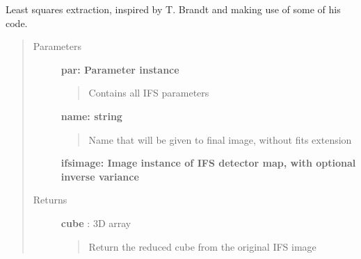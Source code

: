 \documentclass[letterpaper,10pt,english]{sphinxmanual}
\begin{document}
\begin{fulllineitems}
\label{tools:tools.reduction.lstsqExtract}
Least squares extraction, inspired by T. Brandt and making use of some of his code.
\begin{quote}\begin{description}
\item[{Parameters}] \leavevmode
\textbf{par:    Parameter instance}
\begin{quote}

Contains all IFS parameters
\end{quote}

\textbf{name: string}
\begin{quote}

Name that will be given to final image, without fits extension
\end{quote}

\textbf{ifsimage: Image instance of IFS detector map, with optional inverse variance}

\item[{Returns}] \leavevmode
\textbf{cube} :  3D array
\begin{quote}

Return the reduced cube from the original IFS image
\end{quote}

\end{description}\end{quote}

\end{fulllineitems}

\end{document}

